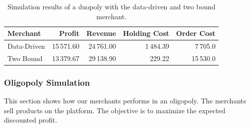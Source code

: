 \begin{table}[t]
	\centering
	\begin{tabular}{lrrrr}
		\toprule
		Merchant & Profit & Revenue & Holding Cost & Order Cost \\
		\midrule
		Data-Driven & 15\,571.60 & 24\,761.00 & 1\,484.39 & 7\,705.0 \\
		Two Bound & 13\,379.67 & 29\,138.90 & 229.22 & 15\,530.0 \\
		\bottomrule
	\end{tabular}
	\caption{Simulation results of a duopoly with the data-driven and two bound merchant.}
	\label{tab:duopoly_bound}
\end{table}



\subsubsection{Oligopoly Simulation}
This section shows how our merchants performs in an oligopoly.
The merchants sell products on the \pricewars platform.
The objective is to maximize the expected discounted profit.

